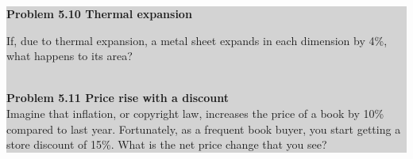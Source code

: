 \documentclass{book}
\begin{document}
\colorbox{lightgray}{
\begin{minipage}{\textwidth}
 {\textbf{Problem 5.10 Thermal expansion}
 
If, due to thermal expansion, a metal sheet expands in each dimension by 4\%,
what happens to its area?}
\\

\textbf{Problem 5.11 Price rise with a discount}
\\

Imagine that inflation, or copyright law, increases the price of a book by 10\%
compared to last year. Fortunately, as a frequent book buyer, you start getting a
store discount of 15\%. What is the net price change that you see?
\end{minipage}
}
\\
\\
\end{document}
